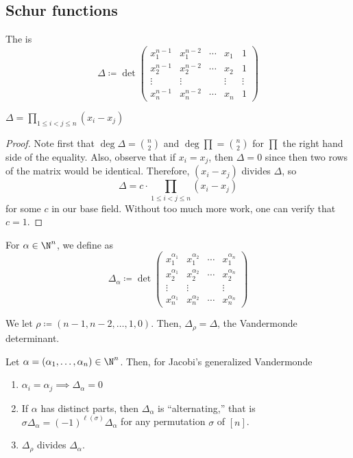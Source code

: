 \documentclass[11pt,leqno,oneside]{amsart}
\numberwithin{thm}{section}
\newcommand{\Vdet}{\Delta}
\newcommand{\rowshift}{\rho}
\newcommand{\defeq}{\coloneqq}
\begin{document}
\subsection{Schur functions}
\begin{defn}
  The  is \[
    \Vdet \defeq \det \left(
      \begin{array}{ccccc}
        x_1^{n-1}&x_1^{n-2}&\cdots&x_1&1\\
        x_2^{n-1}&x_2^{n-2}&\cdots&x_2&1\\
        \vdots& \vdots&&\vdots&\vdots\\
        x_n^{n-1}& x_n^{n-2}&\cdots&x_n&1
      \end{array}
\right)
  \]
\end{defn}
\begin{thm}
  \(\displaystyle \Vdet = \prod_{1 \leq i < j \leq n} (x_i-x_j)\)
\end{thm}
\begin{proof}
  Note first that \(\deg \Vdet = \binom{n}{2}\) and \(\deg \prod =
  \binom{n}{2}\) for \(\prod\) the right hand side of the
  equality. Also, observe that if \(x_i=x_j\), then \(\Vdet = 0\)
  since then two rows of the matrix would be identical. Therefore,
  \((x_i-x_j)\) divides \(\Vdet\), so \[
    \Vdet = c \cdot \prod_{1 \leq i < j \leq n} (x_i-x_j)
  \]
  for some \(c\) in our base field. Without too much more work, one
  can verify that \(c=1\).
\end{proof}
\begin{defn}
  For \(\alpha \in \N^n\), we define  as \[
    \Vdet_\alpha \defeq \det \left(
      \begin{array}{cccc}
        x_1^{\alpha_1}&x_1^{\alpha_2}&\cdots&x_1^{\alpha_n}\\
        x_2^{\alpha_1}&x_2^{\alpha_2}&\cdots&x_2^{\alpha_n}\\
        \vdots& \vdots&&\vdots\\
        x_n^{\alpha_1}& x_n^{\alpha_2}&\cdots&x_n^{\alpha_n}
      \end{array}
    \right)
  \]
\end{defn}
\begin{rmk}
  We let \(\rowshift \defeq (n-1,n-2,\ldots,1,0)\). Then,
  \(\Vdet_\rowshift = \Vdet\), the Vandermonde determinant.
\end{rmk}
\begin{prop}\label{vandermonde-props}
  Let \(\alpha = (\alpha_1, \ldots, \alpha_n) \in \N^n\). Then, for Jacobi's generalized Vandermonde
  \begin{enumerate}
  \item \(\alpha_i = \alpha_j \implies \Vdet_\alpha = 0\)
  \item If \(\alpha\) has distinct parts, then \(\Vdet_\alpha\) is
    ``alternating,'' that is \(\sigma \Vdet_\alpha =
    (-1)^{\ell(\sigma)} \Vdet_{\alpha}\) for any permutation \(\sigma\)
    of \([n]\).
  \item \(\Vdet_\rowshift\) divides \(\Vdet_\alpha\).
  \end{enumerate}
\end{prop}
\end{document}
